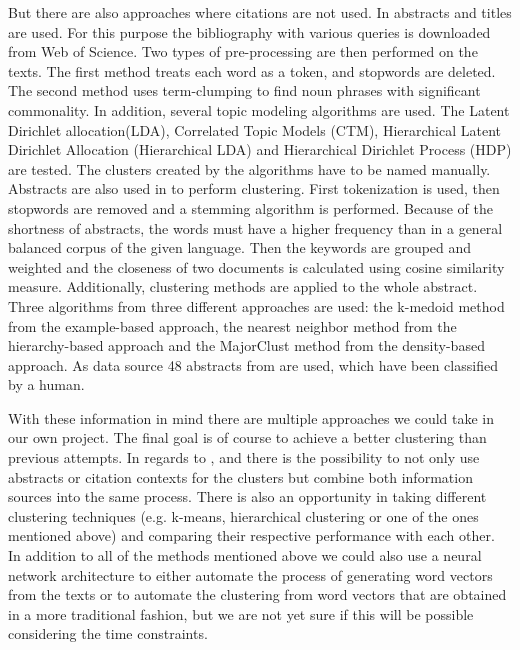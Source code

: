 But there are also approaches where citations are not used.
In \cite{Clustering_scientific_documents_with_topic_modeling} abstracts and titles are used.
For this purpose the bibliography with various queries is downloaded from Web of Science\cite{web_of_science}.  
Two types of pre-processing are then performed on the texts. The first method treats each word as a token, and stopwords are deleted. The second method uses term-clumping to find noun phrases with significant commonality.
In addition, several topic modeling algorithms are used. 
The Latent Dirichlet allocation(LDA), Correlated Topic Models (CTM), Hierarchical Latent Dirichlet Allocation (Hierarchical LDA) and Hierarchical Dirichlet Process (HDP) are tested.
The clusters created by the algorithms have to be named manually.
Abstracts are also used in \cite{An_Approach_to_Clustering_Abstracts} to perform clustering.
First tokenization is used, then stopwords are removed and a stemming algorithm is performed.
Because of the shortness of abstracts, the words must have a higher frequency than in a general balanced corpus of the given language. Then the keywords are grouped and weighted and the closeness of two documents is calculated using cosine similarity measure. 
Additionally, clustering methods are applied to the whole abstract. Three algorithms from three different approaches are used: the k-medoid method from the example-based approach, the nearest neighbor method from the hierarchy-based approach and the MajorClust method from the density-based approach.
As data source 48 abstracts from \cite{cicling} are used, which have been classified by a human.

With these information in mind there are multiple approaches we could take in our own project. The final goal is of course to achieve a better clustering than previous attempts.
In regards to \cite{An_Approach_to_Clustering_Abstracts}, \cite{Document_clustering_of_scientific_texts_using_citation_contexts} and \cite{Clustering_scientific_documents_with_topic_modeling} there is the possibility to not only use abstracts or citation contexts for the clusters but combine both information sources into the same process.
There is also an opportunity in taking different clustering techniques (e.g. k-means, hierarchical clustering or one of the ones mentioned above) and comparing their respective performance with each other.
In addition to all of the methods mentioned above we could also use a neural network architecture to either automate the process of generating word vectors from the texts or to automate the clustering from word vectors that are obtained in a more traditional fashion, but we are not yet sure if this will be possible considering the time constraints.
